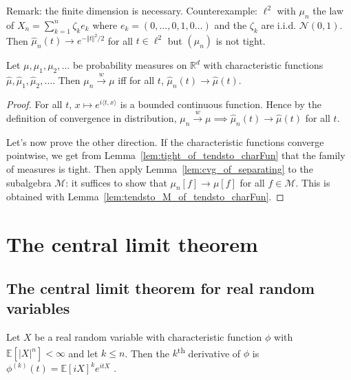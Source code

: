 Remark: the finite dimension is necessary.
Counterexample: $\ell^2$ with $\mu_n$ the law of $X_n = \sum_{k=1}^n \zeta_k e_k$ where $e_k = (0, \ldots, 0, 1, 0 \ldots)$ and the $\zeta_k$ are i.i.d. $\mathcal N(0,1)$.
Then $\hat{\mu}_n(t) \to e^{- \Vert t \Vert^2 / 2}$ for all $t \in \ell^2$ but $(\mu_n)$ is not tight.


\begin{theorem}
\label{thm:charFun_tendsto_iff_measure_tendsto}
\leanok
{}
Let $\mu, \mu_1, \mu_2, \ldots$ be probability measures on $\mathbb{R}^d$ with characteristic functions $\hat{\mu}, \hat{\mu}_1, \hat{\mu}_2, \ldots$. Then $\mu_n \xrightarrow{w} \mu$ iff for all $t$, $\hat{\mu}_n(t) \to \hat{\mu}(t)$.
\end{theorem}

\begin{proof}
\leanok
For all $t$, $x \mapsto e^{i \langle t, x \rangle}$ is a bounded continuous function. Hence by the definition of convergence in distribution, $\mu_n \xrightarrow{w} \mu \implies \hat{\mu}_n(t) \to \hat{\mu}(t)$ for all $t$.

Let's now prove the other direction.
If the characteristic functions converge pointwise, we get from Lemma~\ref{lem:tight_of_tendsto_charFun} that the family of measures is tight.
Then apply Lemma~\ref{lem:cvg_of_separating} to the subalgebra $\mathcal M$: it suffices to show that $\mu_n[f] \to \mu[f]$ for all $f \in \mathcal M$. This is obtained with Lemma~\ref{lem:tendsto_M_of_tendsto_charFun}.
\end{proof}

\chapter{The central limit theorem}

\section{The central limit theorem for real random variables}

\begin{lemma}\label{lem:deriv_charFun}
\leanok
{}
Let $X$ be a real random variable with characteristic function $\phi$ with $\mathbb{E}[\vert X \vert^n] < \infty$ and let $k \le n$.
Then the $k$\textsuperscript{th} derivative of $\phi$ is
$\phi^{(k)}(t) = \mathbb{E}[i X]^k e^{i t X}$ \: .
\end{lemma}

